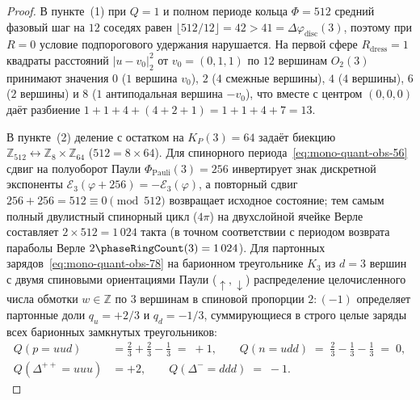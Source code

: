\begin{proof}
В пункте~(1) при $Q = 1$ и полном периоде кольца $\Phi = 512$ средний фазовый шаг на $12$ соседях равен $\lfloor 512/12 \rfloor = 42 > 41 = \Delta\varphi_{\mathrm{disc}}(3)$, поэтому при $R = 0$ условие подпорогового удержания нарушается. На первой сфере $R_{\mathrm{dress}} = 1$ квадраты расстояний $|u - v_0|_2^2$ от $v_0 = (0,1,1)$ по $12$ вершинам $O_2(3)$ принимают значения $0$ ($1$ вершина $v_0$), $2$ ($4$ смежные вершины), $4$ ($4$ вершины), $6$ ($2$ вершины) и $8$ ($1$ антиподальная вершина $-v_0$), что вместе с центром $(0,0,0)$ даёт разбиение $1 + 1 + 4 + (4 + 2 + 1) = 1 + 1 + 4 + 7 = 13$.

В пункте~(2) деление с остатком на $K_P(3) = 64$ задаёт биекцию $\mathbb{Z}_{512} \leftrightarrow \mathbb{Z}_8 \times \mathbb{Z}_{64}$ ($512 = 8 \times 64$). Для спинорного периода~\eqref{eq:mono-quant-obs-56} сдвиг на полуоборот Паули $\Phi_{\mathrm{Pauli}}(3) = 256$ инвертирует знак дискретной экспоненты $\mathcal{E}_3(\varphi + 256) = -\mathcal{E}_3(\varphi)$, а повторный сдвиг $256 + 256 = 512 \equiv 0 \pmod{512}$ возвращает исходное состояние; тем самым полный двулистный спинорный цикл ($4\pi$) на двухслойной ячейке Верле составляет $2 \times 512 = 1\,024$ такта (в точном соответствии с периодом возврата параболы Верле $2\phaseRingCount(3) = 1\,024$). Для партонных зарядов~\eqref{eq:mono-quant-obs-78} на барионном треугольнике $K_3$ из $d = 3$ вершин с двумя спиновыми ориентациями Паули ($\uparrow, \downarrow$) распределение целочисленного числа обмотки $w \in \mathbb{Z}$ по $3$ вершинам в спиновой пропорции $2 : (-1)$ определяет партонные доли $q_u = +2/3$ и $q_d = -1/3$, суммирующиеся в строго целые заряды всех барионных замкнутых треугольников:
\begin{align*}
  Q(p = uud) &= \frac{2}{3} + \frac{2}{3} - \frac{1}{3} \;=\; +1, \qquad
  Q(n = udd) \;=\; \frac{2}{3} - \frac{1}{3} - \frac{1}{3} \;=\; 0, \\
  Q(\Delta^{++} = uuu) &= +2, \qquad
  Q(\Delta^- = ddd) \;=\; -1.
\end{align*}
\end{proof}

